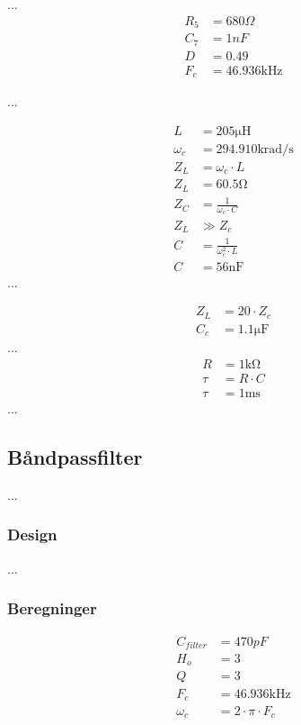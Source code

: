 ...
\begin{align}
R_5 & = 680 \Omega \nonumber \\
C_7 & = 1nF \nonumber \\
D & = 0.49 \nonumber \\
F_c & = 46.936 \si {\kilo\hertz} \nonumber
\end{align}

...

\begin{align}
	L & = 205 \si{\micro \henry} \nonumber  \\
	\omega_c & = 294.910 \si{\kilo\radian\per\second} \nonumber \\
	Z_L & = \omega_c \cdot L \\
	Z_L & = 60.5 \si{\ohm} \nonumber \\
	Z_C & = \frac{1}{\omega_c \cdot C} \\
	Z_L & \gg Z_c \nonumber \\
	C & = \frac{1}{\omega_c ^2 \cdot L}	\\
	C & = 56 \si{\nano\farad} \nonumber
	\end{align}
...

\begin{align}
	Z_L & = 20 \cdot Z_c \\
	C_c & = 1.1 \si{\micro\farad} \nonumber
	\end{align}
...
\begin{align}
	R & = 1 \si{\kilo\ohm} \nonumber \\
	\tau & = R \cdot C \\
	\tau & = 1 \si{\milli\second} \nonumber
\end{align}
...

\subsection{Båndpassfilter}
...

\subsubsection{Design}
...

\subsubsection{Beregninger}

\begin{align}
C_{filter} & = 470pF \nonumber \\
H_o & = 3 \nonumber \\
Q & = 3 \nonumber \\
F_c & = 46.936 \si{\kilo\hertz} \nonumber \\
\omega_c & = 2 \cdot \pi \cdot F_c
\end{align}

